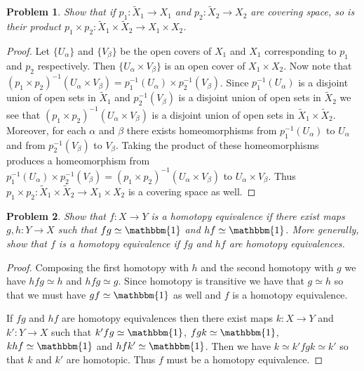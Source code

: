 \documentclass{article}
\newtheorem{problem}{Problem}
\begin{document}
\begin{problem}
Show that if $p_1 : \widetilde{X}_1 \to X_1$ and $p_2 : \widetilde{X}_2 \to X_2$ are covering space, so is their product $p_1 \times p_2 : \widetilde{X}_1 \times \widetilde{X}_2 \to X_1 \times X_2$.
\end{problem}
\begin{proof}
Let $\{U_{\alpha}\}$ and $\{V_{\beta}\}$ be the open covers of $X_1$ and $X_1$ corresponding to $p_1$ and $p_2$ respectively. Then $\{U_{\alpha} \times V_{\beta}\}$ is an open cover of $X_1 \times X_2$. Now note that $(p_1 \times p_2)^{-1} (U_{\alpha} \times V_{\beta}) = p_1^{-1}(U_{\alpha}) \times p_2^{-1}(V_{\beta})$. Since $p_1^{-1}(U_{\alpha})$ is a disjoint union of open sets in $\widetilde{X}_1$ and $p_2^{-1}(V_{\beta})$ is a disjoint union of open sets in $\widetilde{X}_2$ we see that $(p_1 \times p_2)^{-1} (U_{\alpha} \times V_{\beta})$ is a disjoint union of open sets in $\widetilde{X}_1 \times \widetilde{X}_2$. Moreover, for each $\alpha$ and $\beta$ there exists homeomorphisms from $p_1^{-1}(U_{\alpha})$ to $U_{\alpha}$ and from $p_2^{-1}(V_{\beta})$ to $V_{\beta}$. Taking the product of these homeomorphisms produces a homeomorphism from $p_1^{-1}(U_{\alpha}) \times p_2^{-1}(V_{\beta}) = (p_1 \times p_2)^{-1} (U_{\alpha} \times V_{\beta})$ to $U_{\alpha} \times V_{\beta}$. Thus $p_1 \times p_2 : \widetilde{X}_1 \times \widetilde{X}_2 \to X_1 \times X_2$ is a covering space as well.
\end{proof}

\begin{problem}
Show that $f : X \to Y$ is a homotopy equivalence if there exist maps $g, h : Y \to X$ such that $fg \simeq \mathbbm{1}$ and $hf \simeq \mathbbm{1}$. More generally, show that $f$ is a homotopy equivalence if $fg$ and $hf$ are homotopy equivalences.
\end{problem}
\begin{proof}
Composing the first homotopy with $h$ and the second homotopy with $g$ we have $hfg \simeq h$ and $hfg \simeq g$. Since homotopy is transitive we have that $g \simeq h$ so that we must have $gf \simeq \mathbbm{1}$ as well and $f$ is a homotopy equivalence.

If $fg$ and $hf$ are homotopy equivalences then there exist maps $k : X \to Y$ and $k' : Y \to X$ such that $k'fg \simeq \mathbbm{1}$, $fgk \simeq \mathbbm{1}$, $khf \simeq \mathbbm{1}$ and $hfk' \simeq \mathbbm{1}$. Then we have $k \simeq k'fgk \simeq k'$ so that $k$ and $k'$ are homotopic. Thus $f$ must be a homotopy equivalence.
\end{proof}
\end{document}
